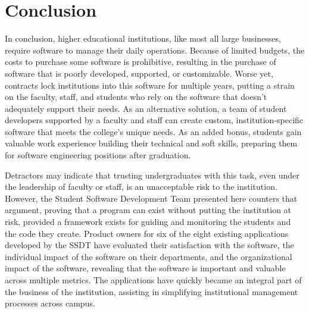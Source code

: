 \section{Conclusion}
In conclusion, higher educational institutions, like most all large businesses, require software to manage their daily operations. Because of limited budgets, the costs to purchase some software is prohibitive, resulting in the purchase of software that is poorly developed, supported, or customizable. Worse yet, contracts lock institutions into this software for multiple years, putting a strain on the faculty, staff, and students who rely on the software that doesn't adequately support their needs. As an alternative solution, a team of student developers supported by a faculty and staff can create custom, institution-specific software that meets the college's unique needs. As an added bonus, students gain valuable work experience building their technical and soft skills, preparing them for software engineering positions after graduation. 

Detractors may indicate that trusting undergraduates with this task, even under the leadership of faculty or staff, is an unacceptable risk to the institution. However, the Student Software Development Team presented here counters that argument, proving that a program can exist without putting the institution at risk, provided a framework exists for guiding and monitoring the students and the code they create. Product owners for six of the eight existing applications developed by the SSDT have evaluated their satisfaction with the software, the individual impact of the software on their departments, and the organizational impact of the software, revealing that the software is important and valuable across multiple metrics. The applications have quickly became an integral part of the business of the institution, assisting in simplifying institutional management processes across campus.